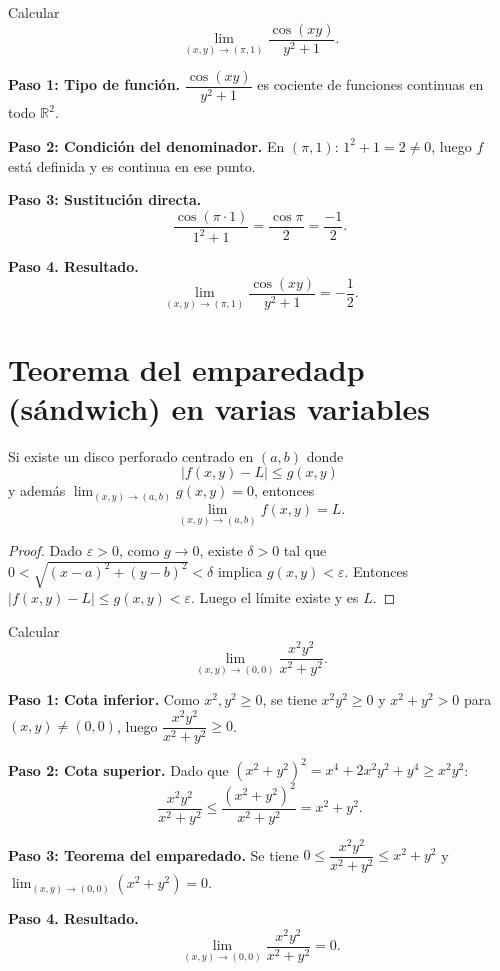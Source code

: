 \begin{example}
Calcular
\[
\lim_{(x,y)\to(\pi,1)} \frac{\cos(xy)}{y^2+1}.
\]
\begin{myproof}
\textbf{Paso 1: Tipo de función.} $\dfrac{\cos(xy)}{y^2+1}$ es cociente
de funciones continuas en todo $\mathbb{R}^2$.

\textbf{Paso 2: Condición del denominador.} En $(\pi,1)$: $1^2+1=2\neq 0$,
luego $f$ está definida y es continua en ese punto.

\textbf{Paso 3: Sustitución directa.}
\[
\frac{\cos(\pi\cdot 1)}{1^2+1}
= \frac{\cos\pi}{2}
= \frac{-1}{2}.
\]

\textbf{Paso 4. Resultado.}
\[
\lim_{(x,y)\to(\pi,1)} \frac{\cos(xy)}{y^2+1} = \boxed{-\frac{1}{2}}.
\]
\end{myproof}
\end{example}

\section{Teorema del emparedadp (sándwich) en varias variables}

\begin{theorem}
Si existe un disco perforado centrado en $(a,b)$ donde
\[
|f(x,y)-L| \leq g(x,y)
\]
y además $\lim_{(x,y)\to(a,b)} g(x,y) = 0$, entonces
\[
\lim_{(x,y)\to(a,b)} f(x,y) = L.
\]
\end{theorem}

\begin{proof}
Dado $\varepsilon>0$, como $g\to 0$, existe $\delta>0$ tal que
$0<\sqrt{(x-a)^2+(y-b)^2}<\delta$ implica $g(x,y)<\varepsilon$.
Entonces $|f(x,y)-L|\leq g(x,y)<\varepsilon$. Luego el límite existe
y es $L$.
\end{proof}

\begin{example}
Calcular
\[
\lim_{(x,y)\to(0,0)} \frac{x^2 y^2}{x^2+y^2}.
\]
\begin{myproof}
\textbf{Paso 1: Cota inferior.} Como $x^2,y^2\geq 0$, se tiene
$x^2y^2\geq 0$ y $x^2+y^2>0$ para $(x,y)\neq(0,0)$, luego
$\dfrac{x^2y^2}{x^2+y^2}\geq 0$.

\textbf{Paso 2: Cota superior.} Dado que $(x^2+y^2)^2 = x^4+2x^2y^2+y^4
\geq x^2y^2$:
\[
\frac{x^2 y^2}{x^2+y^2} \leq \frac{(x^2+y^2)^2}{x^2+y^2} = x^2+y^2.
\]

\textbf{Paso 3: Teorema del emparedado.} Se tiene
$0\leq\dfrac{x^2y^2}{x^2+y^2}\leq x^2+y^2$
y $\lim_{(x,y)\to(0,0)}(x^2+y^2)=0$.

\textbf{Paso 4. Resultado.}
\[
\lim_{(x,y)\to(0,0)} \frac{x^2 y^2}{x^2+y^2} = \boxed{0}.
\]
\end{myproof}
\end{example}


